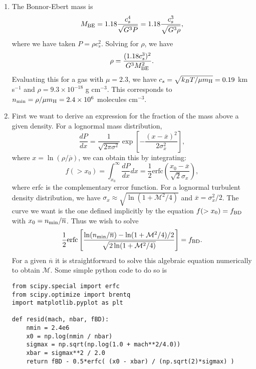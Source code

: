 \begin{enumerate}
\begin{enumerate}
\item The Bonnor-Ebert mass is
\begin{displaymath}
M_{\rm BE} = 1.18 \frac{c_s^4}{\sqrt{G^3 P}} = 1.18\frac{c_s^3}{\sqrt{G^3 \rho}},
\end{displaymath}
where we have taken $P = \rho c_s^2$. Solving for $\rho$, we have
\begin{displaymath}
\rho = \frac{(1.18 c_s^3)^2}{G^3 M_{\rm BE}^2}.
\end{displaymath}
Evaluating this for a gas with $\mu=2.3$, we have $c_s = \sqrt{k_B T/\mu m_{\rm H}} = 0.19$ km s$^{-1}$ and $\rho = 9.3\times 10^{-18}$ g cm$^{-3}$. This corresponds to $n_{\rm min} = \rho/\mu  m_{\rm H}=2.4\times 10^6$ molecules cm$^{-3}$.

\item First we want to derive an expression for the fraction of the mass above a given density. For a lognormal mass distribution,
\begin{displaymath}
\frac{dP}{dx} = \frac{1}{\sqrt{2\pi \sigma^2}} \exp\left[-\frac{\left(x-\overline{x}\right)^2}{2\sigma_x^2}\right],
\end{displaymath}
where $x = \ln(\rho/\overline{\rho})$, we can obtain this by integrating:
\begin{displaymath}
f(>x_0) = \int_{x_0}^\infty \frac{dP}{dx} dx = \frac{1}{2} \mbox{erfc}\left(\frac{x_0-\overline{x}}{\sqrt{2}\sigma_x}\right),
\end{displaymath}
where erfc is the complementary error function. For a lognormal turbulent density distribution, we have $\sigma_x \approx \sqrt{\ln(1+\mathcal{M}^2/4)}$ and $\overline{x} = \sigma_x^2/2$. The curve we want is the one defined implicitly by the equation $f(>x_0) = f_{\rm BD}$ with $x_0 = n_{\rm min}/\overline{n}$. Thus we wish to solve
\begin{displaymath}
\frac{1}{2} \mbox{erfc}\left[\frac{\ln (n_{\rm min}/\overline{n}) - \ln(1+\mathcal{M}^2/4)/2}{\sqrt{2\ln(1+\mathcal{M}^2/4)}}\right] = f_{\rm BD}.
\end{displaymath}
For a given $\overline{n}$ it is straightforward to solve this algebraic equation numerically to obtain $\mathcal{M}$. Some simple python code to do so is
\begin{verbatim}
from scipy.special import erfc
from scipy.optimize import brentq
import matplotlib.pyplot as plt

def resid(mach, nbar, fBD):
    nmin = 2.4e6
    x0 = np.log(nmin / nbar)
    sigmax = np.sqrt(np.log(1.0 + mach**2/4.0))
    xbar = sigmax**2 / 2.0
    return fBD - 0.5*erfc( (x0 - xbar) / (np.sqrt(2)*sigmax) )


\end{verbatim}
\end{enumerate}
\end{enumerate}
